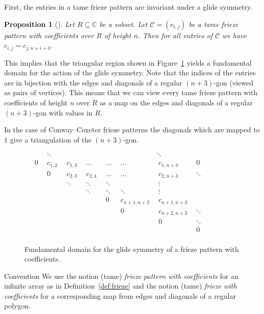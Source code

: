 \documentclass[10pt]{amsart}
\numberwithin{equation}{section}
\newtheorem{prop}[theo]{Proposition}
\theoremstyle{definition}
\theoremstyle{remark}
\newenvironment{enonce*}[2][plain]{\par\noindent\textbf{#2.}\def\currentstyle{#1}\def\remarkstyle{remark}\ifx\currentstyle\remarkstyle\normalfont\else\itshape\fi}{\par}
\begin{document}
First, the entries in a tame frieze pattern are invariant under a glide symmetry.

\begin{prop}[{\cite[Theorem~2.4]{CHJ}}] \label{thm:glide}
Let $R\subseteq \mathbb{C}$ be a subset.
Let $\mathcal{C}=(c_{i,j})$ be a tame frieze pattern with coefficients over $R$ of height
$n$. Then for all entries of $\mathcal{C}$ we have
$c_{i,j} = c_{j,n+i+3}.
$
\end{prop}


This implies that
the triangular region shown
in Figure~\ref{fig:glide} yields 
a fundamental domain for the action of the glide symmetry.
Note that the indices of the entries
are in bijection with the edges and diagonals of a regular $(n+3)$-gon (viewed as pairs of vertices). This means that we can view every tame 
frieze pattern with coefficients of height $n$ over $R$ as a map on the edges and
diagonals of a regular $(n+3)$-gon with values in $R$.

In the case of Conway--Coxeter frieze patterns the diagonals 
which are mapped to $1$ give a triangulation of the $(n+3)$-gon. 

\begin{figure}[htb]\centering
$
\begin{array}{ccccccccc}
& ~~ & ~\ddots~ & ~ & ~~ & ~~ & ~ & \ddots~ & ~\\ 
& ~0~ & ~c_{1,2}~ & ~c_{1,3}~ & ~\ldots~ & ~\ldots~ & ~\ldots~ & ~c_{1,n+3}~ & ~0~ \\ 
& & ~0~ & ~c_{2,3}~ & ~c_{2,4}~ & ~\ldots~ & ~\ldots~ & ~c_{2,n+3}~ & ~\ddots~ \\
& & & ~\ddots~ & ~\ddots~ & ~\ddots~ & ~~ & ~\vdots~ & ~ \\
& & & ~~ & ~\ddots~ & ~\ddots~ & ~\ddots~ & ~\vdots~ & ~\\
& & & ~~ & ~~ & ~0~ & ~c_{n+1,n+2}~ & ~c_{n+1,n+3}~ & ~\\
& & & ~~ & ~~ & ~~ & ~0~ & ~c_{n+2,n+3}~ & ~ \ddots \\
& & & ~~ & ~~ & ~~ & ~~ & ~0~ & ~\ddots \\
& & & ~~ & ~~ & ~~ & ~~ & ~~ & ~0~ \\
\end{array}
$

\caption{Fundamental domain for the glide symmetry of a frieze pattern
with coefficients.\label{fig:glide}}
\end{figure}


\begin{enonce*}[remark]{Convention} 
We use the notion (tame) {\em frieze pattern with coefficients} for an infinite array 
as in Definition~\ref{def:frieze} and the notion (tame) {\em frieze with coefficients} 
for a corresponding map from edges and diagonals of a regular polygon. 
\end{enonce*}
\end{document}

